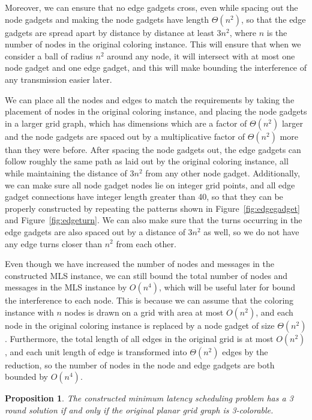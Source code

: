 \documentclass{article}
\newtheorem{proposition}[lemma]{Proposition}
\begin{document}
Moreover, we can ensure that no edge gadgets cross, even while spacing out the node gadgets and making the node gadgets have length $\Theta(n^2)$, so that the edge gadgets are spread apart by distance by distance at least $3 n^2$, where $n$ is the number of nodes in the original coloring instance.  This will ensure that when we consider a ball of radius $n^2$ around any node, it will intersect with at most one node gadget and one edge gadget, and this will make bounding the interference of any transmission easier later.

We can place all the nodes and edges to match the requirements by taking the placement of nodes in the original coloring instance, and placing the node gadgets in a larger grid graph, which has dimensions which are a factor of $\Theta(n^2)$ larger and the node gadgets are spaced out by a multiplicative factor of $\Theta(n^2)$ more than they were before.  After spacing the node gadgets out, the edge gadgets can follow roughly the same path as laid out by the original coloring instance, all while maintaining the distance of $3 n^2$ from any other node gadget.  Additionally, we can make sure all node gadget nodes lie on integer grid points, and all edge gadget connections have integer length greater than 40, so that they can be properly constructed by repeating the patterns shown in Figure~\ref{fig:edgegadget} and Figure~\ref{fig:edgeturn}.  We can also make sure that the turns occurring in the edge gadgets are also spaced out by a distance of $3 n^2$ as well, so we do not have any edge turns closer than $n^2$ from each other.

Even though we have increased the number of nodes and messages in the constructed MLS instance, we can still bound the total number of nodes and messages in the MLS instance by $O(n^4)$, which will be useful later for bound the interference to each node.  This is because we can assume that the coloring instance with $n$ nodes is drawn on a grid with area at most $O(n^2)$, and each node in the original coloring instance is replaced by a node gadget of size $\Theta(n^2)$.  Furthermore, the total length of all edges in the original grid is at most $O(n^2)$, and each unit length of edge is transformed into $\Theta(n^2)$ edges by the reduction, so the number of nodes in the node and edge gadgets are both bounded by $O(n^4)$.



\begin{proposition}
The constructed minimum latency scheduling problem has a 3 round solution if and only if the original planar grid graph is 3-colorable.
\end{proposition}
\end{document}
